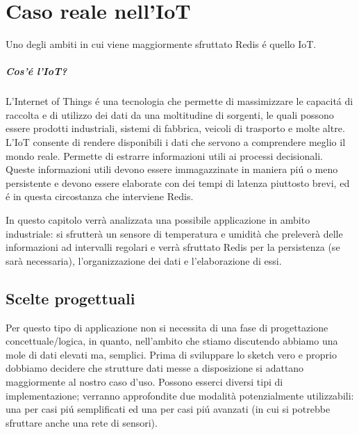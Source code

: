 \chapter{Caso reale nell'IoT}
Uno degli ambiti in cui viene maggiormente sfruttato Redis é quello IoT.
\paragraph{Cos'é l'IoT?\\}
L'Internet of Things é una tecnologia che permette di massimizzare le capacitá di raccolta e di utilizzo
dei dati da una moltitudine di sorgenti, le quali possono essere prodotti industriali, sistemi di fabbrica, veicoli
di trasporto e molte altre.\\
L'IoT consente di rendere disponibili i dati che servono a comprendere meglio il mondo reale.
Permette di estrarre informazioni utili ai processi decisionali.\\
Queste informazioni utili devono essere immagazzinate in maniera piú o meno persistente
e devono essere elaborate con dei tempi di latenza piuttosto brevi, ed é in questa circostanza che interviene Redis.

In questo capitolo verrà analizzata una possibile applicazione in ambito industriale:
si sfrutterà un sensore di temperatura e umidità che preleverà delle informazioni ad intervalli regolari e
verrà sfruttato Redis per la persistenza (se sarà necessaria), l'organizzazione dei dati e l'elaborazione di essi.

\section{Scelte progettuali}
Per questo tipo di applicazione non si necessita di una fase di progettazione concettuale/logica, in quanto,
nell'ambito che stiamo discutendo abbiamo una mole di dati elevati ma, semplici.
Prima di sviluppare lo sketch vero e proprio dobbiamo decidere che strutture dati messe a disposizione si adattano
maggiormente al nostro caso d'uso.
Possono esserci diversi tipi di implementazione;
verranno approfondite due modalità potenzialmente utilizzabili:
una per casi piú semplificati ed una per casi piú avanzati (in cui si potrebbe sfruttare anche una rete di sensori).

